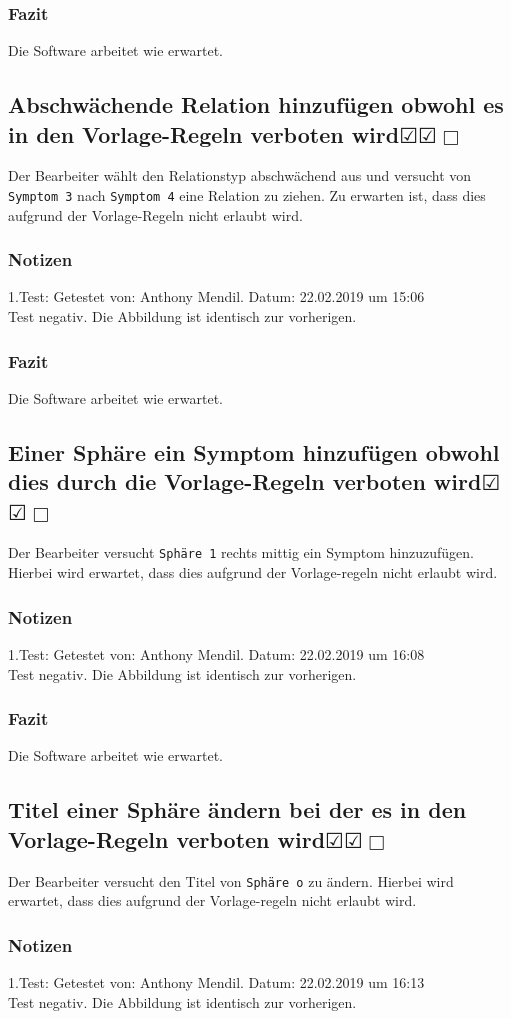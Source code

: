 \documentclass{scrartcl}
\newcommand{\subsectiont}[2]{\subsection[#1]{#1{\normalsize\normalfont #2}}}
\newcommand{\leer}{$\Box$}
\newcommand{\ok}{$\CheckedBox$}
\begin{document}
\subsubsection{Fazit}
Die Software arbeitet wie erwartet.

\subsectiont{Abschwächende Relation hinzufügen obwohl es in den Vorlage-Regeln verboten wird}{\dotfill\ok\ok\leer}
Der Bearbeiter wählt den Relationstyp abschwächend aus und versucht von \texttt{Symptom 3} nach \texttt{Symptom 4} eine Relation zu ziehen. Zu erwarten ist, dass dies aufgrund der Vorlage-Regeln nicht erlaubt wird. 
\subsubsection{Notizen}
1.Test: Getestet von: Anthony Mendil. Datum: 22.02.2019 um 15:06 \\
Test negativ. Die Abbildung ist identisch zur vorherigen.
\subsubsection{Fazit}
Die Software arbeitet wie erwartet.

\subsectiont{Einer Sphäre ein Symptom hinzufügen obwohl dies durch die Vorlage-Regeln verboten wird}{\dotfill\ok\ok\leer}
Der Bearbeiter versucht \texttt{Sphäre 1} rechts mittig ein Symptom hinzuzufügen. Hierbei wird erwartet, dass dies aufgrund der Vorlage-regeln nicht erlaubt wird.
\subsubsection{Notizen}
1.Test: Getestet von: Anthony Mendil. Datum: 22.02.2019 um 16:08 \\
Test negativ. Die Abbildung ist identisch zur vorherigen.
\subsubsection{Fazit}
Die Software arbeitet wie erwartet.

\subsectiont{Titel einer Sphäre ändern bei der es in den Vorlage-Regeln verboten wird}{\dotfill\ok\ok\leer}
Der Bearbeiter versucht den Titel von \texttt{Sphäre o} zu ändern. Hierbei wird erwartet, dass dies aufgrund der Vorlage-regeln nicht erlaubt wird.
\subsubsection{Notizen}
1.Test: Getestet von: Anthony Mendil. Datum: 22.02.2019 um 16:13 \\
Test negativ. Die Abbildung ist identisch zur vorherigen.
\end{document}
